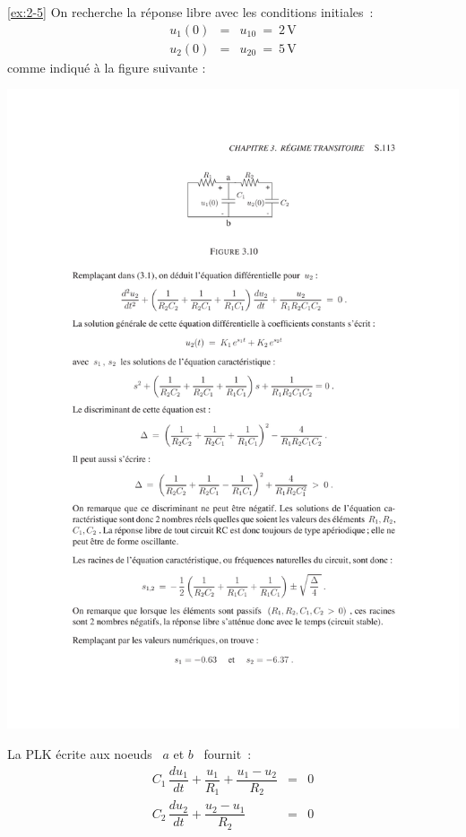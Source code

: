 \begin{solexercise}{\ref{ex:2-5}}
	\label{solex:2-5}
On recherche la r\'eponse libre avec les conditions initiales~:
\begin{eqnarray*}
	u_1(0) &=& u_{10} \: = \: 2\, \mbox{V}\\
	u_2(0) &=& u_{20} \: = \: 5\, \mbox{V}
\end{eqnarray*}
comme indiqu\'e \`a la figure suivante :
\begin{center}
	\includegraphics[width=\linewidth]{sol_exercices/ex3-5}
\end{center}
La PLK \'ecrite aux noeuds \ $a$ et $b$ \ fournit~:
\begin{eqnarray}
C_1 \, \dfrac{du_1}{dt} + \dfrac{u_1}{R_1} + \dfrac{u_1-u_2}{R_2} 
&=& 0 \label{1}\\C_2 \, \dfrac{du_2}{dt} +  \dfrac{u_2-u_1}{R_2} &=& 0 \label{2}
\end{eqnarray}

\end{solexercise}
